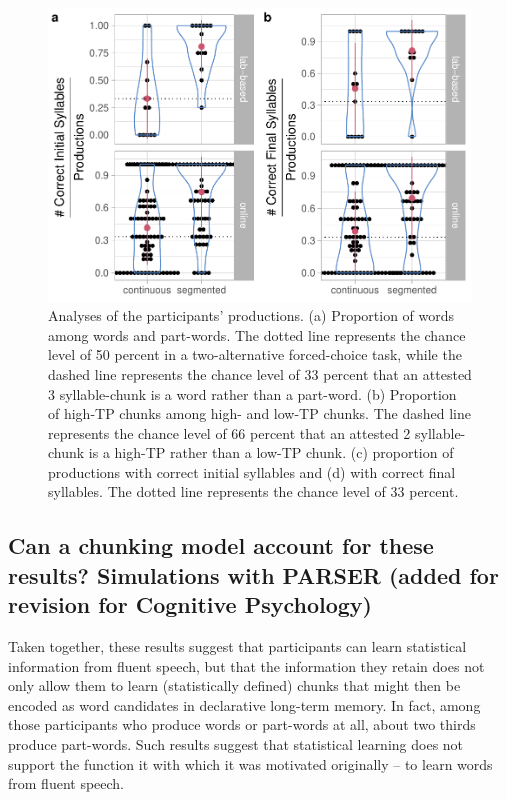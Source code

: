 \documentclass[
]{article}
\begin{document}
\begin{figure}

{\centering \includegraphics[width=0.8\linewidth]{segmentation_recall_combined_for_revision2_files/figure-latex/recall-w-pw-chunks-positions-plot-positions-1} 

}

\caption{Analyses of the participants' productions. (a) Proportion of words among words and part-words. The dotted line represents the chance level of 50 percent in a two-alternative forced-choice task, while the dashed line represents the chance level of 33 percent that an attested 3 syllable-chunk is a word rather than a part-word. (b) Proportion of high-TP chunks among high- and low-TP chunks. The dashed line represents the chance level of 66 percent that an attested 2 syllable-chunk is a high-TP rather than a low-TP chunk. (c) proportion of productions with correct initial syllables and (d) with correct final syllables. The dotted line represents the chance level of 33 percent.}\label{fig:recall-w-pw-chunks-positions-plot-positions}
\end{figure}

\clearpage

\hypertarget{can-a-chunking-model-account-for-these-results-simulations-with-parser-added-for-revision-for-cognitive-psychology}{%
\subsection{Can a chunking model account for these results? Simulations
with PARSER (added for revision for Cognitive
Psychology)}\label{can-a-chunking-model-account-for-these-results-simulations-with-parser-added-for-revision-for-cognitive-psychology}}

Taken together, these results suggest that participants can learn
statistical information from fluent speech, but that the information
they retain does not only allow them to learn (statistically defined)
chunks that might then be encoded as word candidates in declarative
long-term memory. In fact, among those participants who produce words or
part-words at all, about two thirds produce part-words. Such results
suggest that statistical learning does not support the function it with
which it was motivated originally -- to learn words from fluent speech.
\end{document}
